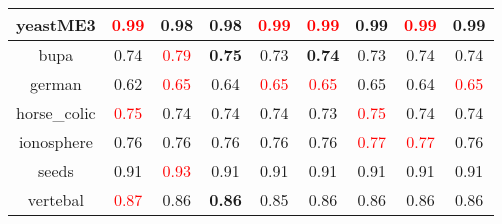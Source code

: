 \documentclass{article}%
\begin{document}
\begin{tabular}{c|cccccccc}
\hline%
yeastME3&\textcolor{red}{ 
0.99
}&0.98&0.98&\textcolor{red}{ 
0.99
}&\textcolor{red}{ 
0.99
}&0.99&\textcolor{red}{ 
0.99
}&0.99\\%
\hline%
bupa&0.74&\textcolor{red}{ 
0.79
}&\textbf{0.75}&0.73&\textbf{0.74}&0.73&0.74&0.74\\%
\hline%
german&0.62&\textcolor{red}{ 
0.65
}&0.64&\textcolor{red}{ 
0.65
}&\textcolor{red}{ 
0.65
}&0.65&0.64&\textcolor{red}{ 
0.65
}\\%
\hline%
horse\_colic&\textcolor{red}{ 
0.75
}&0.74&0.74&0.74&0.73&\textcolor{red}{ 
0.75
}&0.74&0.74\\%
\hline%
ionosphere&0.76&0.76&0.76&0.76&0.76&\textcolor{red}{ 
0.77
}&\textcolor{red}{ 
0.77
}&0.76\\%
\hline%
seeds&0.91&\textcolor{red}{ 
0.93
}&0.91&0.91&0.91&0.91&0.91&0.91\\%
\hline%
vertebal&\textcolor{red}{ 
0.87
}&0.86&\textbf{0.86}&0.85&0.86&0.86&0.86&0.86\\%
\hline%
\end{tabular}

%
\end{document}
